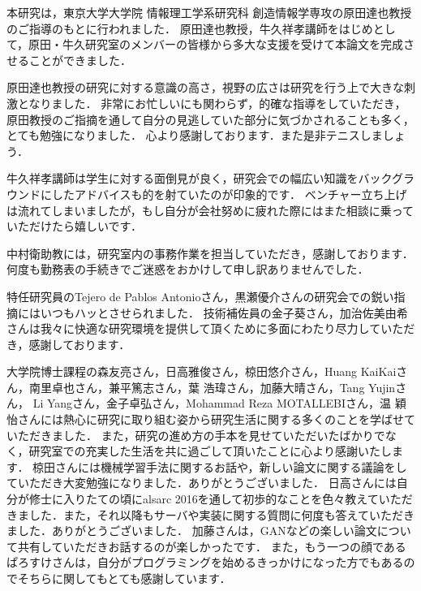 
本研究は，東京大学大学院 情報理工学系研究科 創造情報学専攻の原田達也教授のご指導のもとに行われました．
原田達也教授，牛久祥孝講師をはじめとして，原田・牛久研究室のメンバーの皆様から多大な支援を受けて本論文を完成させることができました．

原田達也教授の研究に対する意識の高さ，視野の広さは研究を行う上で大きな刺激となりました．
非常にお忙しいにも関わらず，的確な指導をしていただき，原田教授のご指摘を通して自分の見逃していた部分に気づかされることも多く，とても勉強になりました．
心より感謝しております．また是非テニスしましょう．

牛久祥孝講師は学生に対する面倒見が良く，研究会での幅広い知識をバックグラウンドにしたアドバイスも的を射ていたのが印象的です．
ベンチャー立ち上げは流れてしまいましたが，もし自分が会社努めに疲れた際にはまた相談に乗っていただけたら嬉しいです．

中村衛助教には，研究室内の事務作業を担当していただき，感謝しております．
何度も勤務表の手続きでご迷惑をおかけして申し訳ありませんでした．

特任研究員のTejero de Pablos Antonioさん，黒瀬優介さんの研究会での鋭い指摘にはいつもハッとさせられました．
技術補佐員の金子葵さん，加治佐美由希さんは我々に快適な研究環境を提供して頂くために多面にわたり尽力していただき，感謝しております．


大学院博士課程の森友亮さん，日高雅俊さん，椋田悠介さん，Huang KaiKaiさん，南里卓也さん，兼平篤志さん，葉 浩瑋さん，加藤大晴さん，Tang Yujinさん，
Li Yangさん，金子卓弘さん，Mohammad Reza MOTALLEBIさん，温 穎怡さんには熱心に研究に取り組む姿から研究生活に関する多くのことを学ばせていただきました．
また，研究の進め方の手本を見せていただいたばかりでなく，研究室での充実した生活を共に過ごして頂いたことに心より感謝いたします．
椋田さんには機械学習手法に関するお話や，新しい論文に関する議論をしていただき大変勉強になりました．ありがとうございました．
日高さんには自分が修士に入りたての頃にalsarc 2016を通して初歩的なことを色々教えていただきました．また，それ以降もサーバや実装に関する質問に何度も答えていただきました．ありがとうございました．
加藤さんは，GANなどの楽しい論文について共有していただきお話するのが楽しかったです．
また，もう一つの顔であるぱろすけさんは，自分がプログラミングを始めるきっかけになった方でもあるのでそちらに関してもとても感謝しています．

